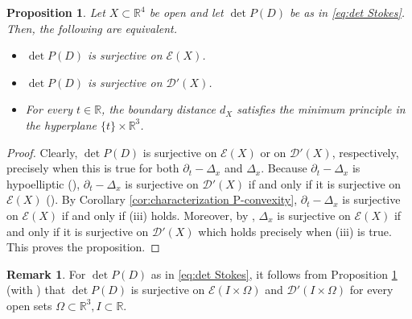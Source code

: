 \documentclass[a4paper,10pt]{amsart}
\newtheorem{proposition}[theorem]{Proposition}
\newtheorem*{crucial lemma}{Lemma \ref{lem:nice polynomial2}}
\theoremstyle{definition}
\newtheorem{remark}[theorem]{Remark}
\newcommand{\R}{\mathbb{R}}
\newcommand{\detP}{\operatorname{det}\!P}
\begin{document}
\begin{proposition}\label{prop:surjectivity for stokes}
	Let $X\subset\R^4$ be open and let $\detP(D)$ be as in \eqref{eq:det Stokes}. Then, the following are equivalent.
	\begin{itemize}
		\item[(i)] $\detP(D)$ is surjective on $\mathscr{E}(X)$.
		\item[(ii)] $\detP(D)$ is surjective on $\mathscr{D}'(X)$.
		\item[(iii)] For every $t\in\R$, the boundary distance $d_X$ satisfies the minimum principle in the hyperplane $\{t\}\times\R^3$.
	\end{itemize}
\end{proposition}
 
\begin{proof}
	Clearly, $\detP(D)$ is surjective on $\mathscr{E}(X)$ or on $\mathscr{D}'(X)$, respectively, precisely when this is true for both $\partial_t-\Delta_x$ and $\Delta_x$. Because $\partial_t-\Delta_x$ is hypoelliptic (\cite[Theorem 11.1.11]{Hor2}), $\partial_t-\Delta_x$ is surjective on $\mathscr{D}'(X)$ if and only if it is surjective on $\mathscr{E}(X)$ (\cite[Corollary 10.7.10 and Theorem 11.1.1]{Hor2}). By Corollary \ref{cor:characterization P-convexity}, $\partial_t-\Delta_x$ is surjective on $\mathscr{E}(X)$ if and only if (iii) holds. Moreover, by \cite[Theorem 9]{Kalmes19}, $\Delta_x$ is surjective on $\mathscr{E}(X)$ if and only if it is surjective on $\mathscr{D}'(X)$ which holds precisely when (iii) is true. This proves the proposition.
\end{proof}
 
 \begin{remark}
	For $\detP(D)$ as in \eqref{eq:det Stokes}, it follows from Proposition \ref{prop:surjectivity for stokes} (with \cite[Lemma 4]{Kalmes19}) that $\detP(D)$ is surjective on $\mathscr{E}\left(I\times \Omega\right)$ and $\mathscr{D}'\left(I\times \Omega\right)$ for every open sets $\Omega\subset\R^3, I\subset\R$.
\end{remark}
 
\end{document}
